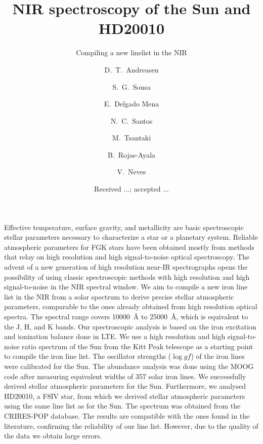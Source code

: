 \documentclass{aa}
\begin{document}
\title{NIR spectroscopy of the Sun and HD20010}
\subtitle{Compiling a new linelist in the NIR}


\author{ D.~T.~Andreasen
    \and S.~G.~Sousa
    \and E.~Delgado Mena
    \and N.~C.~Santos
    \and M.~Tsantaki
    \and B.~Rojas-Ayala
    \and V.~Neves}







\date{Received ...; accepted ...}

\abstract
{Effective temperature, surface gravity, and metallicity are basic
spectroscopic stellar parameters necessary to characterize
a star or a planetary system. Reliable atmospheric parameters for
FGK stars have been obtained mostly from methods that relay on high
resolution and high signal-to-noise optical spectroscopy. The
advent of a new generation of high resolution near-IR spectrographs
opens the possibility of using classic spectroscopic methods with
high resolution and high signal-to-noise in the NIR spectral window.}
{We aim to compile a new iron line list in the NIR from a solar
spectrum to derive precise stellar atmospheric parameters,
comparable to the ones already obtained from high resolution optical
spectra. The spectral range covers \SI{10000}{\angstrom} to
\SI{25000}{\angstrom}, which is equivalent to the J, H, and K bands.}
{Our spectroscopic analysis is based on the iron excitation and
ionization balance done in LTE. We
use a high resolution and high signal-to-noise ratio spectrum of the Sun
from the Kitt Peak telescope as a starting point to compile the iron
line list. The oscillator strengths ($\log\mathit{gf}$) of the iron lines were calibrated for the Sun.
The abundance analysis was done using
the MOOG code after measuring equivalent widths of 357 solar iron lines.}
{We successfully derived stellar atmospheric parameters for the
Sun.
Furthermore, we analysed
HD20010, a F8IV star, from which we derived stellar atmospheric
parameters using the same line list as for the Sun. The spectrum
was obtained from the CRIRES-POP database.
The results are compatible with the ones found in the literature,
confirming the reliability of our line list. However, due to the
quality of the data we obtain large errors.}
{}
\end{document}
